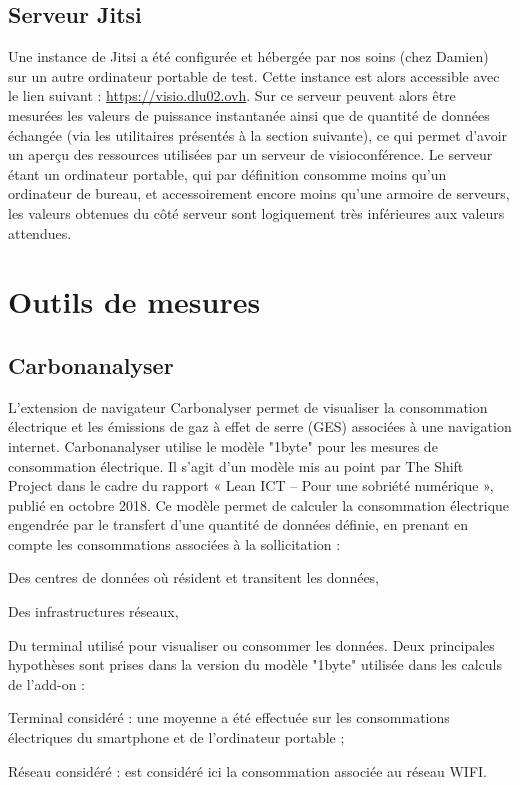 \documentclass[11pt,a4paper]{report}
\begin{document}
\subsection{Serveur Jitsi}
Une instance de Jitsi a été configurée et hébergée par nos soins (chez Damien) sur un autre ordinateur portable de test. Cette instance est alors accessible avec le lien suivant : \url{https://visio.dlu02.ovh}. Sur ce serveur peuvent alors être mesurées les valeurs de puissance instantanée ainsi que de quantité de données échangée (via les utilitaires présentés à la section suivante), ce qui permet d'avoir un aperçu des ressources utilisées par un serveur de visioconférence. 
\br Le serveur étant un ordinateur portable, qui par définition consomme moins qu'un ordinateur de bureau, et accessoirement encore moins qu'une armoire de serveurs, les valeurs obtenues du côté serveur sont logiquement très inférieures aux valeurs attendues. \eb


\section{Outils de mesures}


\subsection{Carbonanalyser}
L’extension de navigateur Carbonalyser permet de visualiser la consommation électrique et les émissions de gaz à effet de serre (GES) associées à une navigation internet.
Carbonanalyser utilise le modèle "1byte" pour les mesures de consommation électrique. Il s'agit d'un modèle mis au point par The Shift Project dans le cadre du rapport « Lean ICT – Pour une sobriété numérique », publié en octobre 2018. Ce modèle permet de calculer la consommation électrique engendrée par le transfert d’une quantité de données définie, en prenant en compte les consommations associées à la sollicitation :
\bi \item Des centres de données où résident et transitent les données,
\item Des infrastructures réseaux,
\item Du terminal utilisé pour visualiser ou consommer les données. \ei
Deux principales hypothèses sont prises dans la version du modèle "1byte" utilisée dans les calculs de l’add-on :
\bi \item Terminal considéré : une moyenne a été effectuée sur les consommations électriques du smartphone et de l’ordinateur portable ;
\item Réseau considéré : est considéré ici la consommation associée au réseau WIFI.  \ei
\end{document}
